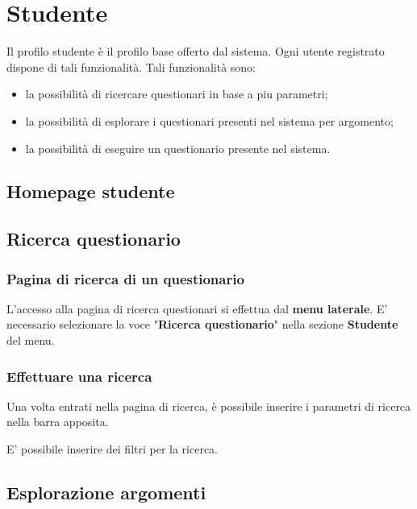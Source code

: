 \documentclass[12pt,a4paper]{article}
\begin{document}
	\newpage

	\section{Studente}\label{studente}
	Il profilo studente è il profilo  base offerto dal sistema. Ogni utente registrato dispone di tali funzionalità. Tali funzionalità sono:
	\begin{itemize}
		\item la possibilità di ricercare questionari in base a piu parametri;
		\item la possibilità di esplorare i questionari presenti nel sistema per argomento;
		\item la possibilità di eseguire un questionario presente nel sistema.
	\end{itemize}
	
	\subsection{Homepage studente}
	\subsection{Ricerca questionario}\label{ricerca_questionario}
	\subsubsection{Pagina di ricerca  di un questionario}
	L'accesso alla pagina di ricerca questionari si effettua dal \textbf{menu laterale}. 
	E' necessario selezionare la voce "\textbf{Ricerca questionario}" nella sezione \textbf{Studente} del menu.
	\subsubsection{Effettuare una ricerca}
	Una volta entrati nella pagina di ricerca, è possibile inserire i parametri di ricerca nella barra apposita.

	
	E' possibile inserire dei filtri per la ricerca. 

	
	\subsection{Esplorazione argomenti}	
	
\end{document}
